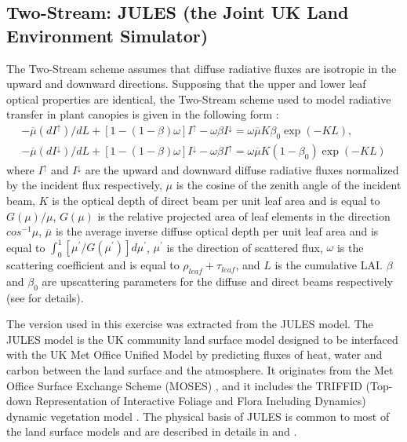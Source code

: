 \documentclass[a4paper,11pt]{report}
\begin{document}
\subsection{Two-Stream: JULES (the Joint UK Land Environment Simulator)} 
The Two-Stream scheme assumes that diffuse radiative fluxes are isotropic in the upward and downward directions. Supposing that the upper and lower leaf optical properties are identical, the Two-Stream scheme used to model radiative transfer in plant canopies is given in the following form \citep{Dickinson1983,Sellers1985}: 
\begin{equation}
\begin{gathered}
-\overline{\mu}(dI^{\uparrow})/dL + [1 - (1 - \beta)\omega]I^{\uparrow} - \omega \beta I^{\downarrow} = \omega \overline{\mu} K \beta_0 \exp{(-KL)},\\
-\overline{\mu}(dI^{\downarrow})/dL + [1 - (1 - \beta)\omega]I^{\downarrow} - \omega \beta I^{\uparrow} = \omega \overline{\mu} K (1-\beta_0) \exp{(-KL)}
\end{gathered}
\label{equation:ts}
\end{equation}
\noindent where $I^{\uparrow}$ and $I^{\downarrow}$ are the upward and downward diffuse radiative fluxes normalized by the incident flux respectively, $\mu$ is the cosine of the zenith angle of the incident beam, $K$ is the optical depth of direct beam per unit leaf area and is equal to $G(\mu)/\mu$, $G(\mu)$ is the relative projected area of leaf elements in the direction $cos^{-1}\mu$, $\overline{\mu}$ is the average inverse diffuse optical depth per unit leaf area and is equal to $\int_{0}^{1}[\mu^{\prime}/G(\mu^{\prime})]d\mu^{\prime}$, $\mu^{\prime}$ is the direction of scattered flux, $\omega$ is the scattering coefficient and is equal to $\rho_{leaf} + \tau_{leaf}$, and $L$ is the cumulative LAI. $\beta$ and $\beta_0$ are upscattering parameters for the diffuse and direct beams respectively (see \citet{Sellers1985} for details). 

The version used in this exercise was extracted from the JULES model. The JULES model is the UK community land surface model designed to be interfaced with the UK Met Office Unified Model \citep{Walters2014} by predicting fluxes of heat, water and carbon between the land surface and the atmosphere. It originates from the Met Office Surface Exchange Scheme (MOSES) \citep{Cox1999}, and it includes the TRIFFID (Top-down Representation of Interactive Foliage and Flora Including Dynamics) dynamic vegetation model \citep{Cox2001}. The physical basis of JULES is common to most of the land surface models and are described in details in \citet{Best2011} and \citet{Clark2011}.
\end{document}
